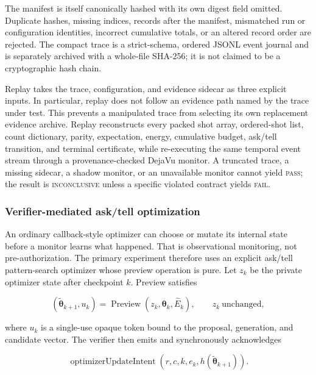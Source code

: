 The manifest is itself canonically hashed with its own digest field omitted.
Duplicate hashes, missing indices, records after the manifest, mismatched run
or configuration identities, incorrect cumulative totals, or an altered
record order are rejected.  The compact trace is a strict-schema, ordered
JSONL event journal and is separately archived with a whole-file SHA-256; it is
not claimed to be a cryptographic hash chain.

Replay takes the trace, configuration, and evidence sidecar as three explicit
inputs.  In particular, replay does not follow an evidence path named by the
trace under test.  This prevents a manipulated trace from selecting its own
replacement evidence archive.  Replay reconstructs every packed shot array,
ordered-shot list, count dictionary, parity, expectation, energy, cumulative
budget, ask/tell transition, and terminal certificate, while re-executing the
same temporal event stream through a provenance-checked DejaVu monitor.  A
truncated trace, a missing sidecar, a shadow monitor, or an unavailable monitor
cannot yield \textsc{pass}; the result is \textsc{inconclusive} unless a
specific violated contract yields \textsc{fail}.

\subsubsection{Verifier-mediated ask/tell optimization}

An ordinary callback-style optimizer can choose or mutate its internal state
before a monitor learns what happened.  That is observational monitoring, not
pre-authorization.  The primary experiment therefore uses an explicit
ask/tell pattern-search optimizer whose preview operation is pure.  Let $z_k$
be the private optimizer state after checkpoint $k$.  Preview satisfies

\begin{equation}
  (\widetilde{\boldsymbol{\theta}}_{k+1},u_k)
    =\operatorname{Preview}(z_k,\boldsymbol{\theta}_k,\widehat{E}_k),
  \qquad z_k\ \text{unchanged},
  \label{eq:rv-preview}
\end{equation}

where $u_k$ is a single-use opaque token bound to the proposal, generation,
and candidate vector.  The verifier then emits and synchronously acknowledges

\begin{equation}
  \operatorname{optimizerUpdateIntent}
  (r,c,k,e_k,h(\widetilde{\boldsymbol{\theta}}_{k+1})).
  \label{eq:rv-authorize}
\end{equation}

